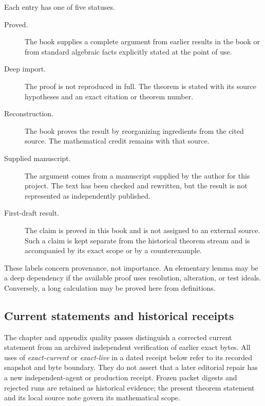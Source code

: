 Each entry has one of five statuses.

\begin{description}
\item[Proved.]
The book supplies a complete argument from earlier results in the book or
from standard algebraic facts explicitly stated at the point of use.

\item[Deep import.]
The proof is not reproduced in full.  The theorem is stated with its
source hypotheses and an exact citation or theorem number.

\item[Reconstruction.]
The book proves the result by reorganizing ingredients from the cited
source.  The mathematical credit remains with that source.

\item[Supplied manuscript.]
The argument comes from a manuscript supplied by the author for this
project.  The text has been checked and rewritten, but the result is not
represented as independently published.

\item[First-draft result.]
The claim is proved in this book and is not assigned to an external source.
Such a claim is kept separate from the historical theorem stream and is
accompanied by its exact scope or by a counterexample.
\end{description}

These labels concern provenance, not importance.  An elementary lemma may
be a deep dependency if the available proof uses resolution, alteration, or
test ideals.  Conversely, a long calculation may be proved here from
definitions.

\subsection{Current statements and historical receipts}
\label{sec:appL-current-boundary}
The chapter and appendix quality passes distinguish a corrected current
statement from an archived independent verification of earlier exact bytes.
All uses of \emph{exact-current} or \emph{exact-live} in a dated receipt
below refer to its recorded snapshot and byte boundary. They do not assert
that a later editorial repair has a new independent-agent or production
receipt. Frozen packet digests and rejected runs are retained as historical
evidence; the present theorem statement and its local source note govern
its mathematical scope.

